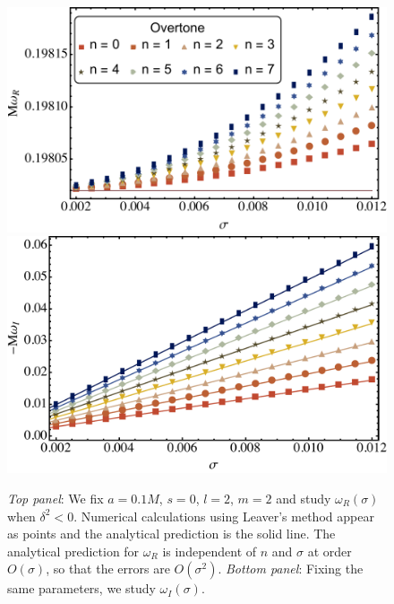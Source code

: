 \begin{refsection}
\begin{figure}[tb]
\includegraphics[width =.95 \columnwidth]{chapter_extremal/etc/a1resRe.pdf}
\includegraphics[width =.95 \columnwidth]{chapter_extremal/etc/a1resIm.pdf}
\caption{{\it Top panel}: We fix $a = 0.1 M$, $s=0 $, $l=2$, $m =2$ and study $\omega_R(\sigma)$ when $\delta^2 <0 $. Numerical calculations using Leaver's method appear as points and the analytical prediction is the solid line. The analytical prediction for $\omega_R$ is independent of $n$ and $\sigma$ at order $O(\sigma)$, so that the errors are $O(\sigma^2)$. {\it Bottom panel}: Fixing the same parameters, we study $\omega_I(\sigma)$. 
}
\label{fig:a1res}
\end{figure}



\end{refsection}
